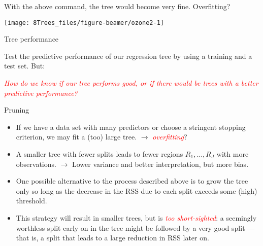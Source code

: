 \documentclass[
  10pt,
  ignorenonframetext,
]{beamer}
\begin{document}
\begin{frame}
With the above command, the tree would become very fine. Overfitting?

\begin{center}\texttt{[image: 8Trees\_files/figure-beamer/ozone2-1]} \end{center}
\end{frame}

\begin{frame}
\begin{block}{Tree performance}
\protect\hypertarget{tree-performance}{}
\(~\)

Test the predictive performance of our regression tree by using a
training and a test set. But:

\vspace{2mm}

\vspace{1mm}

\normalsize

\emph{\textcolor{red}{How do we know if our tree performs good, or if there would be trees with a better predictive performance?}}
\end{block}
\end{frame}

\begin{frame}{Pruning}
\protect\hypertarget{pruning}{}
\begin{itemize}
\item
  If we have a data set with many predictors or choose a stringent
  stopping criterion, we may fit a (too) large tree. \(\rightarrow\)
  \emph{\textcolor{red}{overfitting}}?
\item
  A smaller tree with fewer splits leads to fewer regions
  \(R_1, \ldots, R_J\) with more observations. \(\rightarrow\) Lower
  variance and better interpretation, but more bias.
\item
  One possible alternative to the process described above is to grow the
  tree only so long as the decrease in the RSS due to each split exceeds
  some (high) threshold.
\item
  This strategy will result in smaller trees, but is
  \emph{\textcolor{red}{too short-sighted}}: a seemingly worthless split
  early on in the tree might be followed by a very good split --- that
  is, a split that leads to a large reduction in RSS later on.
\end{itemize}
\end{frame}
\end{document}
